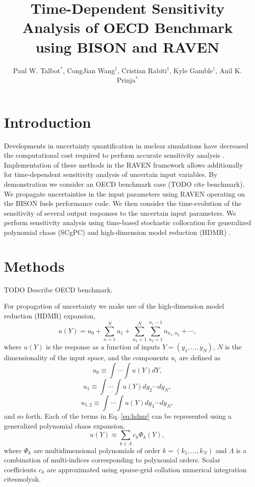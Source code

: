 \documentclass{anstrans} \usepackage{amsmath} \usepackage{amssymb}
\title{Time-Dependent Sensitivity Analysis of OECD Benchmark using BISON and RAVEN}
\author{Paul W. Talbot$^{*}$, 
        CongJian Wang$^{\dagger}$, 
        Cristian Rabiti$^{\dagger}$,
        Kyle Gamble$^{\dagger}$,
        Anil K. Prinja$^{*}$}
\institute{
  $^*$Department of Nuclear Engineering,
  University of New Mexico,
  Albuquerque, NM, 87131 
  \and 
  $^\dagger$Nuclear Engineering Methods Development,
  Idaho National Laboratory,
  Idaho Falls, ID, 83415}
\begin{document}
\section{Introduction}
Developments in uncertainty quantification in nuclear simulations have decreased the computational cost
required to perform accurate sensitivity analysis \cite{cristiansmeared,ans2014,ans2016sum,physor2016}.
Implementation of these methods in the RAVEN \cite{raven} framework allows additionally for time-dependent
sensitivity analysis of uncertain input variables.  By demonstration we consider an OECD benchmark case (TODO
cite benchmark).  We propagate uncertainties in the input parameters using RAVEN operating on the BISON
\cite{bison} fuels performance code.  We then consider the time-evolution of the sensitivity of several output
responses to the uncertain input parameters.  We perform sensitivity analysis  using time-based stochastic 
collocation for generalized polynomial chaos (SCgPC) and high-dimension model reduction (HDMR) \cite{Ayres}.

\section{Methods}
TODO Describe OECD benchmark.

For propagation of uncertainty we make use of the high-dimension model reduction (HDMR) expansion,
\begin{equation}\label{eq:hdmr}
  u(Y) = u_0 + \sum_{n=1}^N u_1 + \sum_{n_1=1}^N\sum_{n_2=1}^{n_1-1} u_{n_1,n_2} + \cdots,
\end{equation}
where $u(Y)$ is the response as a function of inputs $Y=(y_1,\ldots,y_N)$, $N$ is the dimensionality of the
input space, and the components $u_i$ are defined as
\begin{equation}
  u_0 \equiv \int\cdots\int u(Y) dY,
\end{equation}
\begin{equation}
  u_1 \equiv \int\cdots\int u(Y) dy_2\cdots dy_N,
\end{equation}
\begin{equation}
  u_{1,2} \equiv \int\cdots\int u(Y) dy_3\cdots dy_N,
\end{equation}
and so forth.  Each of the terms in Eq. \ref{eq:hdmr} can be represented using a generalized polynomial chaos
expansion,
\begin{equation}
  u(Y) \approx \sum_{k\in\Lambda}c_k\Phi_k(Y),
\end{equation}
where $\Phi_k$ are multidimensional polynomials of order $k=(k_1,\ldots,k_N)$ and $\Lambda$ is a combination
of multi-indices corresponding to polynomial orders.  Scalar coefficients $c_k$ are approximated using
sparse-grid collation numerical integration cite{smolyak}.
\end{document}
